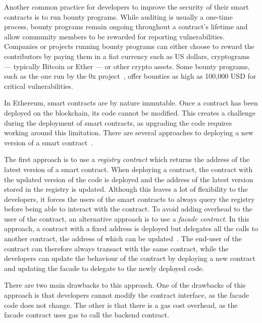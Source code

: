 Another common practice for developers to improve the security of their smart contracts is to run bounty programs. While auditing is usually a one-time process, bounty programs remain ongoing throughout a contract's lifetime and allow community members to be rewarded for reporting vulnerabilities. Companies or projects running bounty programs can either choose to reward the contributors by paying them in a fiat currency such as US dollars, cryptograms --- typically Bitcoin or Ether --- or other crypto assets. Some bounty programs, such as the one run by the 0x project~\cite{0x-project}, offer bounties as high as 100,000 USD for critical vulnerabilities.

In Ethereum, smart contracts are by nature immutable. Once a contract has been deployed on the blockchain, its code cannot be modified. This creates a challenge during the deployment of smart contracts, as upgrading the code requires working around this limitation. There are several approaches to deploying a new version of a smart contract~\cite{consensys-smart-contract-best-practice}.

The first approach is to use a \emph{registry contract} which returns the address of the latest version of a smart contract. When deploying a contract, the contract with the updated version of the code is deployed and the address of the latest version stored in the registry is updated. Although this leaves a lot of flexibility to the developers, it forces the users of the smart contracts to always query the registry before being able to interact with the contract. To avoid adding overhead to the user of the contract, an alternative approach is to use a \emph{facade contract}. In this approach, a contract with a fixed address is deployed but delegates all the calls to another contract, the address of which can be updated~\cite{eip-delegatecall}. The end-user of the contract can therefore always transact with the same contract, while the developers can update the behaviour of the contract by deploying a new contract and updating the facade to delegate to the newly deployed code.

There are two main drawbacks to this approach. One of the drawbacks of this approach is that developers cannot modify the contract interface, as the facade code does not change. The other is that there is a gas cost overhead, as the facade contract uses gas to call the backend contract.


